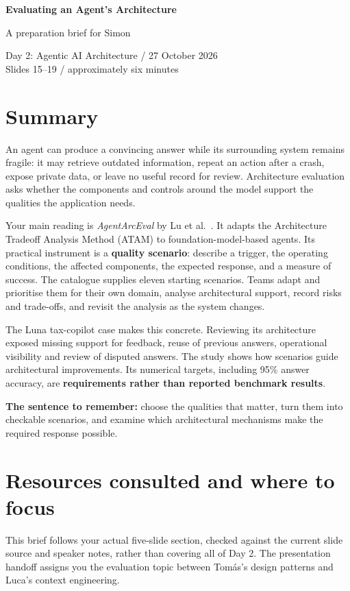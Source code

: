 \documentclass[11pt,a4paper]{article}
\begin{document}
\begin{center}
{\LARGE\bfseries Evaluating an Agent's Architecture\par}
\vspace{0.4em}
{\large A preparation brief for Simon\par}
Day 2: Agentic AI Architecture / 27 October 2026\\
Slides 15--19 / approximately six minutes
\end{center}

\section*{Summary}
An agent can produce a convincing answer while its surrounding system remains fragile: it may retrieve outdated information, repeat an action after a crash, expose private data, or leave no useful record for review. Architecture evaluation asks whether the components and controls around the model support the qualities the application needs.

Your main reading is \emph{AgentArcEval} by Lu et al.\ \cite{arceval}. It adapts the Architecture Tradeoff Analysis Method (ATAM) to foundation-model-based agents. Its practical instrument is a \textbf{quality scenario}: describe a trigger, the operating conditions, the affected components, the expected response, and a measure of success. The catalogue supplies eleven starting scenarios. Teams adapt and prioritise them for their own domain, analyse architectural support, record risks and trade-offs, and revisit the analysis as the system changes.

The Luna tax-copilot case makes this concrete. Reviewing its architecture exposed missing support for feedback, reuse of previous answers, operational visibility and review of disputed answers. The study shows how scenarios guide architectural improvements. Its numerical targets, including 95\% answer accuracy, are \textbf{requirements rather than reported benchmark results}.

\textbf{The sentence to remember:} choose the qualities that matter, turn them into checkable scenarios, and examine which architectural mechanisms make the required response possible.

\section{Resources consulted and where to focus}
This brief follows your actual five-slide section, checked against the current slide source and speaker notes, rather than covering all of Day 2. The presentation handoff assigns you the evaluation topic between Tom\'as's design patterns and Luca's context engineering.
\end{document}
